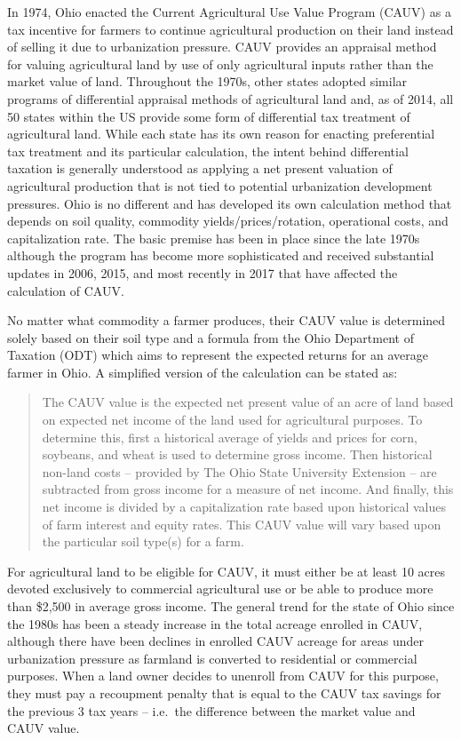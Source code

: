 \documentclass[]{article}
\begin{document}
In 1974, Ohio enacted the Current Agricultural Use Value Program (CAUV)
as a tax incentive for farmers to continue agricultural production on
their land instead of selling it due to urbanization pressure. CAUV
provides an appraisal method for valuing agricultural land by use of
only agricultural inputs rather than the market value of land.
Throughout the 1970s, other states adopted similar programs of
differential appraisal methods of agricultural land and, as of 2014, all
50 states within the US provide some form of differential tax treatment
of agricultural land. While each state has its own reason for enacting
preferential tax treatment and its particular calculation, the intent
behind differential taxation is generally understood as applying a net
present valuation of agricultural production that is not tied to
potential urbanization development pressures. Ohio is no different and
has developed its own calculation method that depends on soil quality,
commodity yields/prices/rotation, operational costs, and capitalization
rate. The basic premise has been in place since the late 1970s although
the program has become more sophisticated and received substantial
updates in 2006, 2015, and most recently in 2017 that have affected the
calculation of CAUV.

No matter what commodity a farmer produces, their CAUV value is
determined solely based on their soil type and a formula from the Ohio
Department of Taxation (ODT) which aims to represent the expected
returns for an average farmer in Ohio. A simplified version of the
calculation can be stated as:

\begin{quote}
The CAUV value is the expected net present value of an acre of land
based on expected net income of the land used for agricultural purposes.
To determine this, first a historical average of yields and prices for
corn, soybeans, and wheat is used to determine gross income. Then
historical non-land costs -- provided by The Ohio State University
Extension -- are subtracted from gross income for a measure of net
income. And finally, this net income is divided by a capitalization rate
based upon historical values of farm interest and equity rates. This
CAUV value will vary based upon the particular soil type(s) for a farm.
\end{quote}

For agricultural land to be eligible for CAUV, it must either be at
least 10 acres devoted exclusively to commercial agricultural use or be
able to produce more than \$2,500 in average gross income. The general
trend for the state of Ohio since the 1980s has been a steady increase
in the total acreage enrolled in CAUV, although there have been declines
in enrolled CAUV acreage for areas under urbanization pressure as
farmland is converted to residential or commercial purposes. When a land
owner decides to unenroll from CAUV for this purpose, they must pay a
recoupment penalty that is equal to the CAUV tax savings for the
previous 3 tax years -- i.e.~the difference between the market value and
CAUV value.
\end{document}
